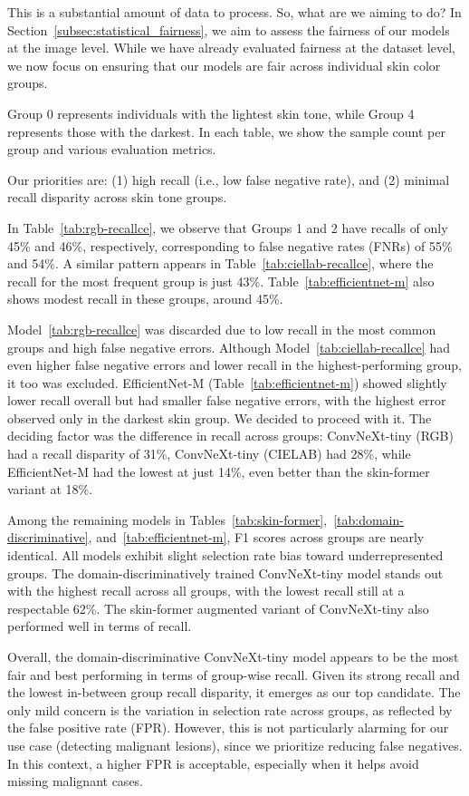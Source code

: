 This is a substantial amount of data to process. So, what are we aiming to do? In Section~\ref{subsec:statistical_fairness}, we aim to assess the fairness of our models at the image level. While we have already evaluated fairness at the dataset level, we now focus on ensuring that our models are fair across individual skin color groups.

Group 0 represents individuals with the lightest skin tone, while Group 4 represents those with the darkest. In each table, we show the sample count per group and various evaluation metrics.

Our priorities are: (1) high recall (i.e., low false negative rate), and (2) minimal recall disparity across skin tone groups.

In Table~\ref{tab:rgb-recallce}, we observe that Groups 1 and 2 have recalls of only 45\% and 46\%, respectively, corresponding to false negative rates (FNRs) of 55\% and 54\%. A similar pattern appears in Table~\ref{tab:ciellab-recallce}, where the recall for the most frequent group is just 43\%. Table~\ref{tab:efficientnet-m} also shows modest recall in these groups, around 45\%.

Model~\ref{tab:rgb-recallce} was discarded due to low recall in the most common groups and high false negative errors. Although Model~\ref{tab:ciellab-recallce} had even higher false negative errors and lower recall in the highest-performing group, it too was excluded. EfficientNet-M (Table~\ref{tab:efficientnet-m}) showed slightly lower recall overall but had smaller false negative errors, with the highest error observed only in the darkest skin group. We decided to proceed with it. The deciding factor was the difference in recall across groups: ConvNeXt-tiny (RGB) had a recall disparity of 31\%, ConvNeXt-tiny (CIELAB) had 28\%, while EfficientNet-M had the lowest at just 14\%, even better than the skin-former variant at 18\%.

Among the remaining models in Tables~\ref{tab:skin-former},~\ref{tab:domain-discriminative}, and~\ref{tab:efficientnet-m}, F1 scores across groups are nearly identical. All models exhibit slight selection rate bias toward underrepresented groups. The domain-discriminatively trained ConvNeXt-tiny model stands out with the highest recall across all groups, with the lowest recall still at a respectable 62\%. The skin-former augmented variant of ConvNeXt-tiny also performed well in terms of recall.

Overall, the domain-discriminative ConvNeXt-tiny model appears to be the most fair and best performing in terms of group-wise recall. Given its strong recall and the lowest in-between group recall disparity, it emerges as our top candidate. The only mild concern is the variation in selection rate across groups, as reflected by the false positive rate (FPR). However, this is not particularly alarming for our use case (detecting malignant lesions), since we prioritize reducing false negatives. In this context, a higher FPR is acceptable, especially when it helps avoid missing malignant cases.

